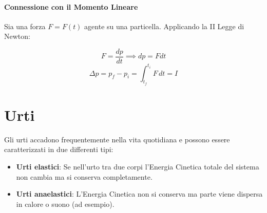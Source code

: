         \paragraph{Connessione con il Momento Lineare} Sia una forza $F = F(t)$
        agente su una particella. Applicando la II Legge di Newton:

        \begin{equation*}
            F = \frac{dp}{dt} \implies dp = F dt
        \end{equation*}
        \begin{equation*}
            \Delta p = p_f - p_i = \int_{t_f}^{t_i} F \,dt = I 
        \end{equation*}
    
    \section{Urti} Gli urti accadono frequentemente nella vita quotidiana e 
    possono essere caratterizzati in due differenti tipi:
    \begin{itemize}
        \item \textbf{Urti elastici}: Se nell'urto tra due corpi l'Energia 
        Cinetica totale del sistema non cambia ma si conserva completamente.
        \item \textbf{Urti anaelastici}: L'Energia Cinetica non si conserva ma 
        parte viene dispersa in calore o suono (ad esempio).
    \end{itemize} 

